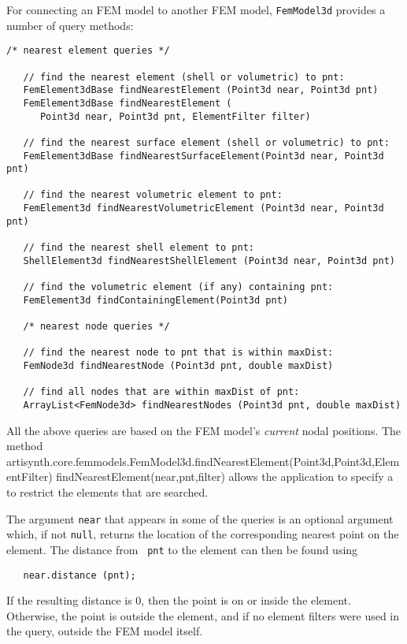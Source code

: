 For connecting an FEM model to another FEM model, {\tt FemModel3d}
provides a number of query methods:
%
\begin{lstlisting}[]
   /* nearest element queries */

   // find the nearest element (shell or volumetric) to pnt:
   FemElement3dBase findNearestElement (Point3d near, Point3d pnt)
   FemElement3dBase findNearestElement (
      Point3d near, Point3d pnt, ElementFilter filter)

   // find the nearest surface element (shell or volumetric) to pnt:
   FemElement3dBase findNearestSurfaceElement(Point3d near, Point3d pnt)

   // find the nearest volumetric element to pnt:
   FemElement3d findNearestVolumetricElement (Point3d near, Point3d pnt)

   // find the nearest shell element to pnt:
   ShellElement3d findNearestShellElement (Point3d near, Point3d pnt)

   // find the volumetric element (if any) containing pnt:
   FemElement3d findContainingElement(Point3d pnt)

   /* nearest node queries */

   // find the nearest node to pnt that is within maxDist:
   FemNode3d findNearestNode (Point3d pnt, double maxDist)

   // find all nodes that are within maxDist of pnt:
   ArrayList<FemNode3d> findNearestNodes (Point3d pnt, double maxDist)
\end{lstlisting}
%
All the above queries are based on the FEM model's {\it current} nodal
positions.  The method\\
\javamethodAlt%
{artisynth.core.femmodels.FemModel3d.findNearestElement(Point3d,Point3d,ElementFilter)}%
{findNearestElement(near,pnt,filter)} allows the application to
specify
a  to
restrict the elements that are searched.

The argument {\tt near} that appears in some of the queries is an
optional argument which, if not {\tt null}, returns the location of
the corresponding nearest point on the element. The distance from {\tt
pnt} to the element can then be found using
%
\begin{verbatim}
   near.distance (pnt);
\end{verbatim}
%
If the resulting distance is 0, then the point is on or inside the
element. Otherwise, the point is outside the element, and if no
element filters were used in the query, outside the FEM model itself.

